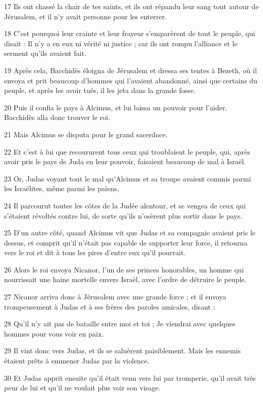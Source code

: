\par 17 Ils ont chassé la chair de tes saints, et ils ont répandu leur sang tout autour de Jérusalem, et il n'y avait personne pour les enterrer.
\par 18 C'est pourquoi leur crainte et leur frayeur s'emparèrent de tout le peuple, qui disait : Il n'y a en eux ni vérité ni justice ; car ils ont rompu l'alliance et le serment qu'ils avaient fait.
\par 19 Après cela, Bacchidès éloigna de Jérusalem et dressa ses tentes à Bezeth, où il envoya et prit beaucoup d'hommes qui l'avaient abandonné, ainsi que certains du peuple, et après les avoir tués, il les jeta dans la grande fosse.
\par 20 Puis il confia le pays à Alcimus, et lui laissa un pouvoir pour l'aider. Bacchidès alla donc trouver le roi.
\par 21 Mais Alcimus se disputa pour le grand sacerdoce.
\par 22 Et c'est à lui que recoururent tous ceux qui troublaient le peuple, qui, après avoir pris le pays de Juda en leur pouvoir, faisaient beaucoup de mal à Israël.
\par 23 Or, Judas voyant tout le mal qu'Alcimus et sa troupe avaient commis parmi les Israélites, même parmi les païens,
\par 24 Il parcourut toutes les côtes de la Judée alentour, et se vengea de ceux qui s'étaient révoltés contre lui, de sorte qu'ils n'osèrent plus sortir dans le pays.
\par 25 D'un autre côté, quand Alcimus vit que Judas et sa compagnie avaient pris le dessus, et comprit qu'il n'était pas capable de supporter leur force, il retourna vers le roi et dit à tous les pires d'entre eux qu'il pourrait.
\par 26 Alors le roi envoya Nicanor, l'un de ses princes honorables, un homme qui nourrissait une haine mortelle envers Israël, avec l'ordre de détruire le peuple.
\par 27 Nicanor arriva donc à Jérusalem avec une grande force ; et il envoya trompeusement à Judas et à ses frères des paroles amicales, disant :
\par 28 Qu'il n'y ait pas de bataille entre moi et toi ; Je viendrai avec quelques hommes pour vous voir en paix.
\par 29 Il vint donc vers Judas, et ils se saluèrent paisiblement. Mais les ennemis étaient prêts à emmener Judas par la violence.
\par 30 Et Judas apprit ensuite qu'il était venu vers lui par tromperie, qu'il avait très peur de lui et qu'il ne voulait plus voir son visage.
